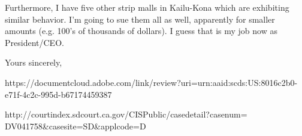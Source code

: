 \documentclass[a4paper]{arthur-letter}
\begin{document}
\begin{letter}
            Furthermore, I have five other strip malls in Kailu-Kona which are exhibiting similar behavior. I'm going to sue them all as well, apparently for smaller amounts (e.g. 100's of thousands of dollars). I guess that is my job now as President/CEO. 
            

            \closing{Yours sincerely,} %


    \end{letter}
\begin{thebibliography}{}

https://documentcloud.adobe.com/link/review?uri=urn:aaid:scds:US:8016c2b0-e71f-4c2c-995d-b67174459387

http://courtindex.sdcourt.ca.gov/CISPublic/casedetail?casenum= DV041758\&casesite=SD\&applcode=D

\end{thebibliography}
\end{document}
